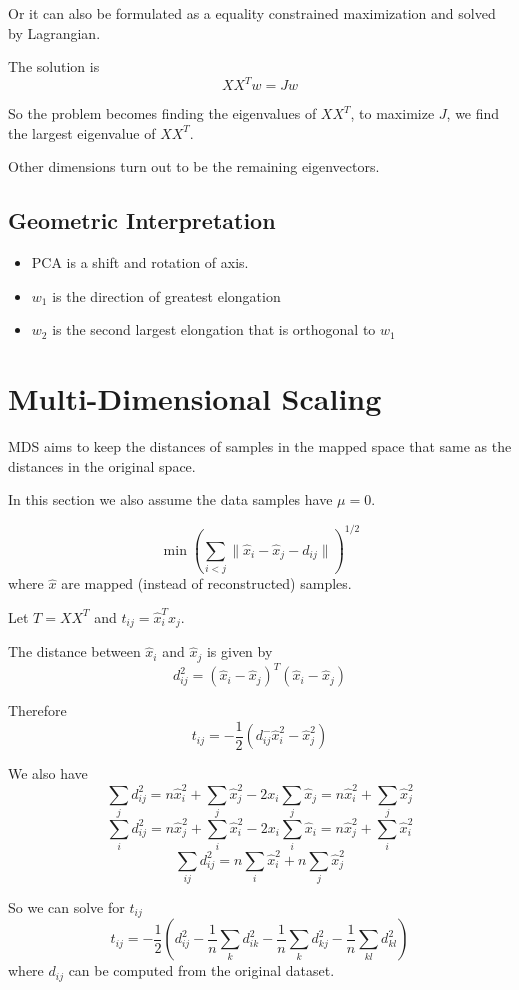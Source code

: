         Or it can also be formulated as a equality constrained maximization and solved by Lagrangian.

        The solution is
        \[ XX^Tw=Jw \]

        So the problem becomes finding the eigenvalues of $XX^T$, to maximize $J$, we find the largest eigenvalue of $XX^T$.

        Other dimensions turn out to be the remaining eigenvectors.

    \subsection{Geometric Interpretation}
        \begin{itemize}
            \item PCA is a shift and rotation of axis.
            \item $w_1$ is the direction of greatest elongation
            \item $w_2$ is the second largest elongation that is orthogonal to $w_1$
        \end{itemize}


\section{Multi-Dimensional Scaling}
    MDS aims to keep the distances of samples in the mapped space that same as the distances in the original space.

    In this section we also assume the data samples have $\mu=0$.

    \[ \min \left(\sum_{i<j}\|\hat{x}_i-\hat{x}_j-d_{ij}\|\right)^{1/2} \]
    where $\hat{x}$ are mapped (instead of reconstructed) samples.

    Let $T=XX^T$ and $t_{ij}=\hat{x}_i^T\hat{x}_j$.

    The distance between $\hat{x}_i$ and $\hat{x}_j$ is given by
    \[d_{ij}^2 = (\hat{x}_i-\hat{x}_j)^T(\hat{x}_i-\hat{x}_j)\]

    Therefore
    \[ t_{ij} = -\frac{1}{2}(d_{ij}^-\hat{x}_i^2-\hat{x}_j^2) \]

    We also have
    \[\sum_j d_{ij}^2 = n\hat{x}_i^2 + \sum_j\hat{x}_j^2 - 2x_i\sum_j\hat{x}_j = n\hat{x}_i^2 + \sum_j\hat{x}_j^2\]
    \[\sum_i d_{ij}^2 = n\hat{x}_j^2 + \sum_i\hat{x}_i^2 - 2x_i\sum_i\hat{x}_i = n\hat{x}_j^2 + \sum_i\hat{x}_i^2\]
    \[\sum_{ij}d_{ij}^2=n\sum_i\hat{x}_i^2 + n\sum_j\hat{x}_j^2 \]

    So we can solve for $t_{ij}$
    \[ t_{ij} = -\frac{1}{2}\left(d_{ij}^2-\frac{1}{n}\sum_kd_{ik}^2-\frac{1}{n}\sum_kd_{kj}^2-\frac{1}{n}\sum_{kl}d_{kl}^2\right) \]
    where $d_{ij}$ can be computed from the original dataset.

